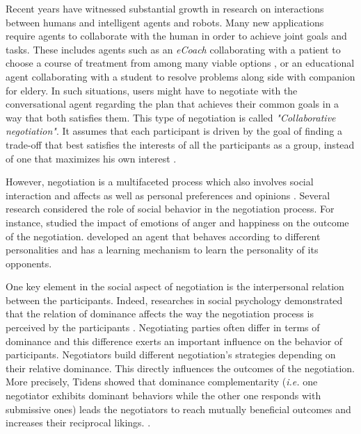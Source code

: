 \documentclass[conference, letterpaper]{IEEEtran}
\begin{document}
		Recent years have witnessed substantial growth in research on interactions between humans and intelligent agents and robots. Many new applications require agents to collaborate with the human in order to achieve joint goals and tasks. These includes agents such as an \textit{eCoach} collaborating with a patient to choose a course of treatment from among many viable options \cite{robertson2015visual}, or an educational agent collaborating with a student to resolve problems \cite{howard2017shifting} along side with companion for eldery. In such situations, users might have to negotiate with the conversational agent regarding the plan that achieves their common goals in a way that both satisfies them. This type of negotiation is called \emph{"Collaborative negotiation"}. It assumes that each participant is driven by the goal of finding a trade-off that best satisfies the interests of all the participants as a group, instead of one that maximizes his own interest \cite{sidner1994artificial,chu1995response}.
	
	
		However, negotiation is a multifaceted process which also involves social interaction and affects as well as personal preferences and opinions  \cite{bro2010affective}. Several research considered the role of social behavior in the negotiation process. For instance, \cite{de2011effect} studied the impact of emotions of anger and happiness on the outcome of the negotiation.  \cite{kraus1995designing} developed an agent that behaves according to different personalities	and has a learning mechanism to learn the personality of its opponents. 
	
		One key element in the social aspect of negotiation is the interpersonal relation between the participants. Indeed, researches in social psychology demonstrated that the relation of dominance affects the way the negotiation process is perceived by the participants \cite{van2006power}.  
		Negotiating parties often differ in terms of dominance and this difference exerts an important influence on the behavior of participants. Negotiators build different negotiation's strategies depending on their relative dominance. This directly influences the outcomes of the negotiation. More precisely, Tidens \cite{tiedens2003power} showed that dominance complementarity (\emph{i.e.} one negotiator exhibits dominant behaviors while the other one responds with submissive ones) leads the negotiators to reach mutually beneficial outcomes and increases their reciprocal likings. \cite{wiltermuth2015benefits,tiedens2003power}.
	
\end{document}
